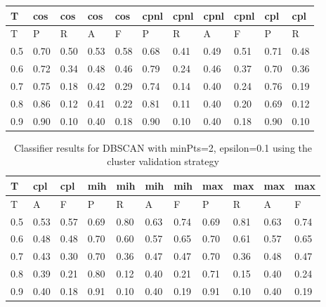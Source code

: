 \begin{center}
\begin{table}[!h]
\centering
\begin{tabular}{|l|l|l|l|l|l|l|l|l|l|l|}
  \hline
T & cos & cos & cos & cos & cpnl & cpnl & cpnl & cpnl & cpl & cpl \\ 
  \hline
T & P & R & A & F & P & R & A & F & P & R \\ 
   \hline
0.5 & 0.70 & 0.50 & 0.53 & 0.58 & 0.68 & 0.41 & 0.49 & 0.51 & 0.71 & 0.48 \\ 
  0.6 & 0.72 & 0.34 & 0.48 & 0.46 & 0.79 & 0.24 & 0.46 & 0.37 & 0.70 & 0.36 \\ 
  0.7 & 0.75 & 0.18 & 0.42 & 0.29 & 0.74 & 0.14 & 0.40 & 0.24 & 0.76 & 0.19 \\ 
  0.8 & 0.86 & 0.12 & 0.41 & 0.22 & 0.81 & 0.11 & 0.40 & 0.20 & 0.69 & 0.12 \\ 
  0.9 & 0.90 & 0.10 & 0.40 & 0.18 & 0.90 & 0.10 & 0.40 & 0.18 & 0.90 & 0.10 \\ 
   \hline
\end{tabular}
\end{table}
\begin{table}[!h]
\centering
\begin{tabular}{|l|l|l|l|l|l|l|l|l|l|l|}
  \hline
T & cpl & cpl & mih & mih & mih & mih & max & max & max & max \\ 
  \hline
T & A & F & P & R & A & F & P & R & A & F \\ 
   \hline
0.5 & 0.53 & 0.57 & 0.69 & 0.80 & 0.63 & 0.74 & 0.69 & 0.81 & 0.63 & 0.74 \\ 
  0.6 & 0.48 & 0.48 & 0.70 & 0.60 & 0.57 & 0.65 & 0.70 & 0.61 & 0.57 & 0.65 \\ 
  0.7 & 0.43 & 0.30 & 0.70 & 0.36 & 0.47 & 0.47 & 0.70 & 0.36 & 0.48 & 0.47 \\ 
  0.8 & 0.39 & 0.21 & 0.80 & 0.12 & 0.40 & 0.21 & 0.71 & 0.15 & 0.40 & 0.24 \\ 
  0.9 & 0.40 & 0.18 & 0.91 & 0.10 & 0.40 & 0.19 & 0.91 & 0.10 & 0.40 & 0.19 \\ 
   \hline
\end{tabular}
\caption{Classifier results for DBSCAN with minPts=2, epsilon=0.1 using the cluster validation strategy} 
\label{tab:dbscan-minpts-2-eps-0-1-cluster}
\end{table}\end{center}

